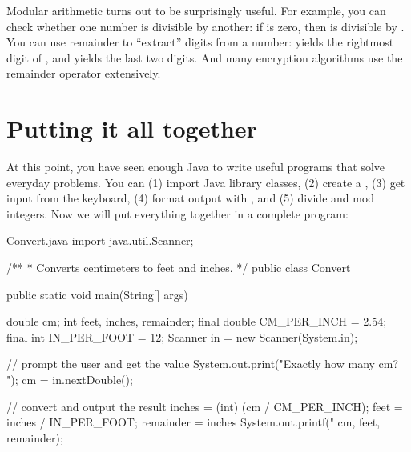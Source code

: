 

Modular arithmetic turns out to be surprisingly useful.
For example, you can check whether one number is divisible by another: if  is zero, then  is divisible by .
You can use remainder to ``extract'' digits from a number:  yields the rightmost digit of , and  yields the last two digits.
And many encryption algorithms use the remainder operator extensively.


\section{Putting it all together}

At this point, you have seen enough Java to write useful programs that solve everyday problems.
You can (1) import Java library classes, (2) create a , (3) get input from the keyboard, (4) format output with , and (5) divide and mod integers.
Now we will put everything together in a complete program:



\begin{trinket}{Convert.java}
import java.util.Scanner;

/**
 * Converts centimeters to feet and inches.
 */
public class Convert {

    public static void main(String[] args) {
        double cm;
        int feet, inches, remainder;
        final double CM_PER_INCH = 2.54;
        final int IN_PER_FOOT = 12;
        Scanner in = new Scanner(System.in);

        // prompt the user and get the value
        System.out.print("Exactly how many cm? ");
        cm = in.nextDouble();

        // convert and output the result
        inches = (int) (cm / CM_PER_INCH);
        feet = inches / IN_PER_FOOT;
        remainder = inches %
        System.out.printf("%
                          cm, feet, remainder);
    }
}
\end{trinket}

